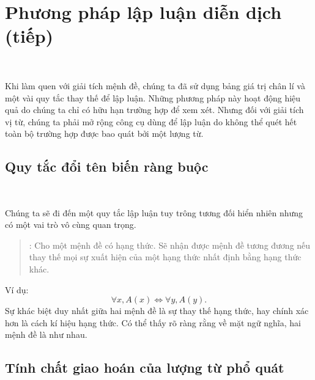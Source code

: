 \section{Phương pháp lập luận diễn dịch (tiếp)}

\

Khi làm quen với giải tích mệnh đề, chúng ta đã sử dụng bảng giá trị chân lí và một vài quy tắc thay thế để lập luận. Những phương pháp này hoạt động hiệu quả do chúng ta chỉ có hữu hạn trường hợp để xem xét. Nhưng đối với giải tích vị từ, chúng ta phải mở rộng công cụ dùng để lập luận do không thể quét hết toàn bộ trường hợp được bao quát bởi một lượng từ.

\subsection{Quy tắc đổi tên biến ràng buộc}

\ 

Chúng ta sẽ đi đến một quy tắc lập luận tuy trông tương đối hiển nhiên nhưng có một vai trò vô cùng quan trọng.
\begin{quotation}
    : Cho một mệnh đề có hạng thức. Sẽ nhận được mệnh đề tương đương nếu thay thế mọi sự xuất hiện của một hạng thức nhất định bằng hạng thức khác.
\end{quotation}
Ví dụ:
\begin{equation*}
    \forall x, A(x) \iff \forall y, A(y).
\end{equation*}
Sự khác biệt duy nhất giữa hai mệnh đề là sự thay thế hạng thức, hay chính xác hơn là cách kí hiệu hạng thức. Có thể thấy rõ ràng rằng về mặt ngữ nghĩa, hai mệnh đề là như nhau.

\subsection{Tính chất giao hoán của lượng từ phổ quát}

\

